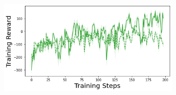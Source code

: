 \begin{figure}
\begin{subfigure}{.24\textwidth}
    \end{subfigure}
    \begin{subfigure}{.24\textwidth}
        \includegraphics[width=\textwidth]{sections/011_icml2022/resources/lunarlander-training_total_reward-postnet-training-strategy.png}
    \end{subfigure}
    

\end{figure}
